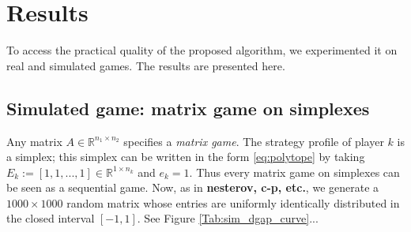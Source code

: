 \documentclass[12pt]{article}
\begin{document}
\section{Results}
\label{sec:results}
To access the practical quality of the proposed algorithm, we experimented it on real and simulated games. The results are presented here.

\subsection{Simulated game: matrix game on simplexes}
Any matrix $A \in \mathbb{R}^{n_1 \times n_2}$ specifies a \textit{matrix game}. The strategy profile of player $k$ is a simplex; this simplex can be written in the form \eqref{eq:polytope} by taking $E_k := [1, 1, ..., 1] \in \mathbb{R}^{1 \times n_k}$ and $e_k = 1$. Thus every matrix game on simplexes can be seen as a sequential game. Now, as in \textbf{nesterov, c-p, etc.}, we generate a $1000 \times 1000$ random matrix whose entries are uniformly identically distributed in the closed interval $[-1, 1]$.
See Figure \ref{Tab:sim_dgap_curve}...
\end{document}
